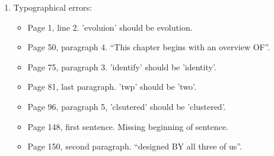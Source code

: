 \begin{enumerate}
\item{Typographical errors:
  \begin{itemize}
  \item{Page 1, line 2. 'evoluion' should be evolution.}
  \item{Page 50, paragraph 4. “This chapter begins with an overview
    OF”.}
  \item{Page 75, paragraph 3. 'identify' should be 'identity'.}
  \item{Page 81, last paragraph. 'twp' should be 'two'.}
  \item{Page 96, paragraph 5, 'clsutered' should be 'clustered'.}
  \item{Page 148, first sentence. Missing beginning of sentence.}
  \item{Page 150, second paragraph. “designed BY all three of us”.}
  \end{itemize}
}
\end{enumerate}
